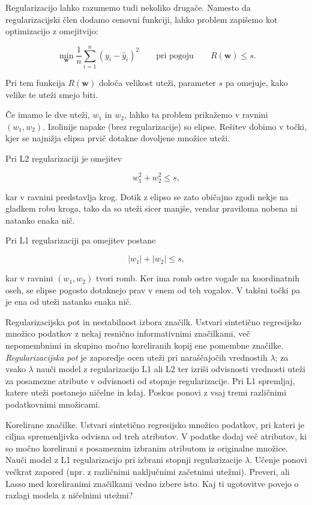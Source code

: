 Regularizacijo lahko razumemo tudi nekoliko drugače. Namesto da regularizacijski člen dodamo cenovni funkciji, lahko problem zapišemo kot optimizacijo z omejitvijo:

\[
\min_{\mathbf{w}} 
\frac{1}{n}\sum_{i=1}^{n}(y_i-\hat{y}_i)^2
\qquad
\text{pri pogoju}
\qquad
R(\mathbf w) \le s .
\]

Pri tem funkcija $R(\mathbf w)$ določa velikost uteži, parameter $s$ pa omejuje, kako velike te uteži smejo biti.

Če imamo le dve uteži, $w_1$ in $w_2$, lahko ta problem prikažemo v ravnini $(w_1,w_2)$. Izolinije napake (brez regularizacije) so elipse. Rešitev dobimo v točki, kjer se najnižja elipsa prvič dotakne dovoljene množice uteži.

Pri L2 regularizaciji je omejitev

\[
w_1^2 + w_2^2 \le s ,
\]

kar v ravnini predstavlja krog. Dotik z elipso se zato običajno zgodi nekje na gladkem robu kroga, tako da so uteži sicer manjše, vendar praviloma nobena ni natanko enaka nič.

Pri L1 regularizaciji pa omejitev postane

\[
|w_1| + |w_2| \le s ,
\]

kar v ravnini $(w_1,w_2)$ tvori romb. Ker ima romb ostre vogale na koordinatnih oseh, se elipse pogosto dotaknejo prav v enem od teh vogalov. V takšni točki pa je ena od uteži natanko enaka nič.

\begin{exercise}{Regularizacijska pot in nestabilnost izbora značilk.}
Ustvari sintetično regresijsko množico podatkov z nekaj resnično informativnimi značilkami, več nepomembnimi in skupino močno koreliranih kopij ene pomembne značilke. \emph{Regularizacijska pot} je zaporedje ocen uteži pri naraščajočih vrednostih $\lambda$; za vsako $\lambda$ nauči model z regularizacijo L1 ali L2 ter izriši odvisnosti vrednosti uteži za posamezne atribute v odvisnosti od stopnje regularizacije. Pri L1 spremljaj, katere uteži postanejo ničelne in kdaj. Poskus ponovi z vsaj tremi različnimi podatkovnimi množicami.
\end{exercise}

\begin{exercise}{Korelirane značilke.}
Ustvari sintetično regresijsko množico podatkov, pri kateri je ciljna spremenljivka odvisna od treh atributov. V podatke dodaj več atributov, ki so močno korelirani s posameznim izbranim atributom iz originalne množice. Nauči model z L1 regularizacijo pri izbrani stopnji regularizacije $\lambda$. Učenje ponovi večkrat zapored (npr. z različnimi naključnimi začetnimi utežmi). Preveri, ali Lasso med koreliranimi značilkami vedno izbere isto. Kaj ti ugotovitve povejo o razlagi modela z ničelnimi utežmi?
\end{exercise}


